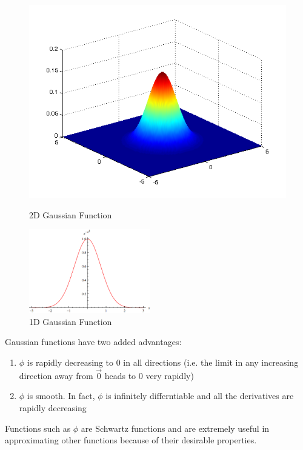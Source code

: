 \documentclass{article}
\begin{document}
\begin{figure}[h]
    \begin{minipage}{0.5\textwidth}
    \centering
    \includegraphics[scale=0.3]{gauss2d.png}
    \caption{2D Gaussian Function}
    \end{minipage}
    \begin{minipage}{0.5\textwidth}
    \centering
    \includegraphics[scale=0.5]{gauss1d.png}
    \caption{1D Gaussian Function}
    \end{minipage}
\end{figure}

Gaussian functions  have two added advantages:
\begin{enumerate}
    \item $\phi$ is rapidly decreasing to 0 in all directions (i.e. the limit in any increasing direction away from $\vec{0}$ heads to 0 very rapidly)
    \item $\phi$ is smooth. In fact, $\phi$ is infinitely differntiable and all the derivatives are rapidly decreasing
\end{enumerate}
Functions such as $\phi$ are Schwartz functions and are extremely useful in approximating other functions because
of their desirable properties. 
\end{document}

